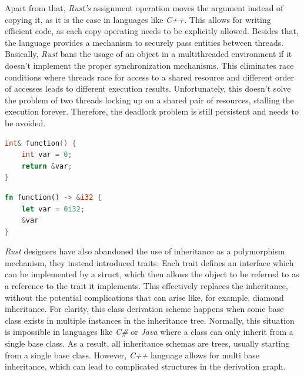 Apart from that, \textit{Rust's} assignment operation moves the argument instead of copying it, as it is the case in languages like \textit{C++}. This allows for writing efficient code, as each copy operating needs to be explicitly allowed. Besides that, the language provides a mechanism to securely pass entities between threads. Basically, \textit{Rust} bans the usage of an object in a multithreaded environment if it doesn't implement the proper synchronization mechanisms. This eliminates race conditions where threads race for access to a shared resource and different order of accesses leads to different execution results. Unfortunately, this doesn't solve the problem of two threads locking up on a shared pair of resources, stalling the execution forever. Therefore, the deadlock problem is still persistent and needs to be avoided. 

\begin{minipage}{.4\textwidth}
    \begin{lstlisting}[language=c++,caption={Example of a memory corruption bug in C++.},captionpos=b,label={badcpp}]
int& function() {
    int var = 0;
    return &var;
}
    \end{lstlisting} 
\end{minipage}
\hfill\vline\hfill
\begin{minipage}{.4\textwidth}
    \begin{lstlisting}[language=rust,caption={Replicating a memory corruption bug in Rust.},captionpos=b,label={badrust}]
fn function() -> &i32 {
    let var = 0i32;
    &var
} 
    \end{lstlisting}
\end{minipage}

\textit{Rust} designers have also abandoned the use of inheritance as a polymorphism mechanism, they instead introduced traits. Each trait defines an interface which can be implemented by a struct, which then allows the object to be referred to as a reference to the trait it implements. This effectively replaces the inheritance, without the potential complications that can arise like, for example, diamond inheritance. For clarity, this class derivation scheme happens when some base class exists in multiple instances in the inheritance tree. Normally, this situation is impossible in languages like \textit{C\#} or \textit{Java} where a class can only inherit from a single base class. As a result, all inheritance schemas are trees, usually starting from a single base class. However, \textit{C++} language allows for multi base inheritance, which can lead to complicated structures in the derivation graph.


